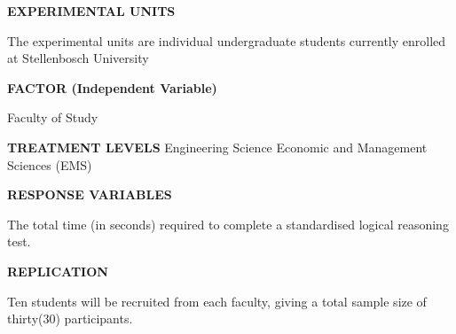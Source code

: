 \documentclass[
]{article}
\begin{document}
\textbf{EXPERIMENTAL UNITS}

The experimental units are individual undergraduate students currently
enrolled at Stellenbosch University

\textbf{FACTOR (Independent Variable)}

Faculty of Study

\textbf{TREATMENT LEVELS} Engineering Science Economic and Management
Sciences (EMS)

\textbf{RESPONSE VARIABLES}

The total time (in seconds) required to complete a standardised logical
reasoning test.

\textbf{REPLICATION}

Ten students will be recruited from each faculty, giving a total sample
size of thirty(30) participants.
\end{document}
